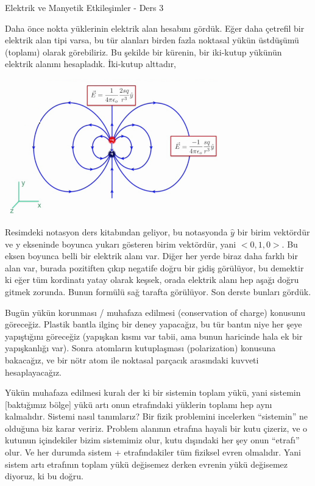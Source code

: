 \documentclass[12pt,fleqn]{article}\usepackage{../../common}
\begin{document}
Elektrik ve Manyetik Etkileşimler - Ders 3

Daha önce nokta yüklerinin elektrik alan hesabını gördük. Eğer daha çetrefil bir
elektrik alan tipi varsa, bu tür alanları birden fazla noktasal yükün üstdüşümü
(toplamı) olarak görebiliriz. Bu şekilde bir kürenin, bir iki-kutup yükünün
elektrik alanını hesapladık. İki-kutup alttadır,

\includegraphics[width=25em]{03_01.png}

Resimdeki notasyon ders kitabından geliyor, bu notasyonda $\hat{y}$ bir birim
vektördür ve y ekseninde boyunca yukarı gösteren birim vektördür, yani
$<0,1,0>$. Bu eksen boyunca belli bir elektrik alanı var. Diğer her yerde biraz
daha farklı bir alan var, burada pozitiften çıkıp negatife doğru bir gidiş
görülüyor, bu demektir ki eğer tüm kordinatı yatay olarak keşsek, orada elektrik
alanı hep aşağı doğru gitmek zorunda. Bunun formülü sağ tarafta görülüyor. Son
derste bunları gördük.

Bugün yükün korunması / muhafaza edilmesi (conservation of charge) konusunu
göreceğiz. Plastik bantla ilginç bir deney yapacağız, bu tür bantın niye her
şeye yapıştığını göreceğiz (yapışkan kısmı var tabii, ama bunun haricinde hala
ek bir yapışkanlığı var). Sonra atomların kutuplaşması (polarization) konusuna
bakacağız, ve bir nötr atom ile noktasal parçacık arasındaki kuvveti
hesaplayacağız. 

Yükün muhafaza edilmesi kuralı der ki bir sistemin toplam yükü, yani sistemin
[baktığımız bölge] yükü artı onun etrafındaki yüklerin toplamı hep aynı
kalmalıdır. Sistemi nasıl tanımlarız? Bir fizik problemini incelerken
``sistemin'' ne olduğuna biz karar veririz. Problem alanının etrafına hayali bir
kutu çizeriz, ve o kutunun içindekiler bizim sistemimiz olur, kutu dışındaki her
şey onun ``etrafı'' olur. Ve her durumda sistem + etrafındakiler tüm fiziksel
evren olmalıdır. Yani sistem artı etrafının toplam yükü değisemez derken evrenin
yükü değisemez diyoruz, ki bu doğru.
\end{document}
